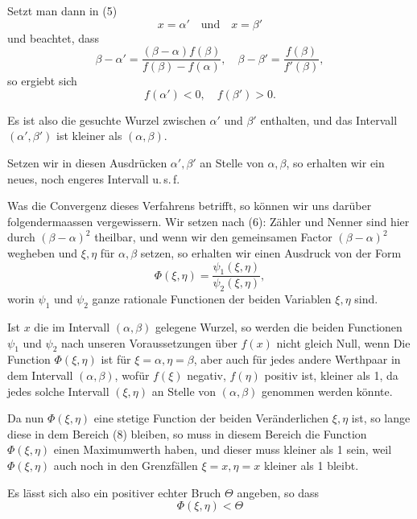 
Setzt man dann in (5)
\[
x = \alpha' \quad \text{und} \quad x = \beta'
\]
und beachtet, dass
\[
\beta - \alpha' = \frac{(\beta - \alpha)f(\beta)}{f(\beta) - f(\alpha)}, \quad \beta - \beta' = \frac{f(\beta)}{f'(\beta)},
\]
so ergiebt sich
\[
f(\alpha') < 0, \quad f(\beta') > 0.
\]

Es ist also die gesuchte Wurzel zwischen $\alpha'$ und $\beta'$ enthalten,
und das Intervall $(\alpha', \beta')$ ist kleiner als $(\alpha, \beta)$.

Setzen wir in diesen Ausdr\"ucken $\alpha', \beta'$ an Stelle von $\alpha, \beta$,
so erhalten wir ein neues, noch engeres Intervall u.\,s.\,f.

Was die Convergenz dieses Verfahrens betrifft, so k\"onnen
wir uns dar\"uber folgendermaassen vergewissern. Wir setzen
nach (6):
Z\"ahler und Nenner sind hier durch $(\beta - \alpha)^2$ theilbar, und
wenn wir den gemeinsamen Factor $(\beta - \alpha)^2$ wegheben und $\xi, \eta$
f\"ur $\alpha, \beta$ setzen, so erhalten wir einen Ausdruck von der Form
\[
\Phi(\xi, \eta) = \frac{\psi_1(\xi, \eta)}{\psi_2(\xi, \eta)},
\]
worin $\psi_1$ und $\psi_2$ ganze rationale Functionen der beiden Variablen
$\xi, \eta$ sind.

Ist $x$ die im Intervall $(\alpha, \beta)$ gelegene Wurzel, so werden die
beiden Functionen $\psi_1$ und $\psi_2$ nach unseren Voraussetzungen
\"uber $f(x)$ nicht gleich Null, wenn
Die Function $\Phi(\xi, \eta)$ ist f\"ur $\xi = \alpha, \eta = \beta$, aber auch f\"ur
jedes andere Werthpaar in dem Intervall $(\alpha, \beta)$, wof\"ur $f(\xi)$
negativ, $f(\eta)$ positiv ist, kleiner als 1, da jedes solche Intervall
$(\xi, \eta)$ an Stelle von $(\alpha, \beta)$ genommen werden k\"onnte.

Da nun $\Phi(\xi, \eta)$ eine stetige Function der beiden Ver\"anderlichen
 $\xi, \eta$ ist, so lange diese in dem Bereich (8) bleiben, so
muss in diesem Bereich die Function $\Phi(\xi, \eta)$ einen Maximumwerth
 haben, und dieser muss kleiner als 1 sein, weil $\Phi(\xi, \eta)$
auch noch in den Grenzf\"allen $\xi = x, \eta = x$ kleiner als 1 bleibt.

Es l\"asst sich also ein positiver echter Bruch $\Theta$ angeben,
so dass
\[
\Phi(\xi, \eta) < \Theta
\]
